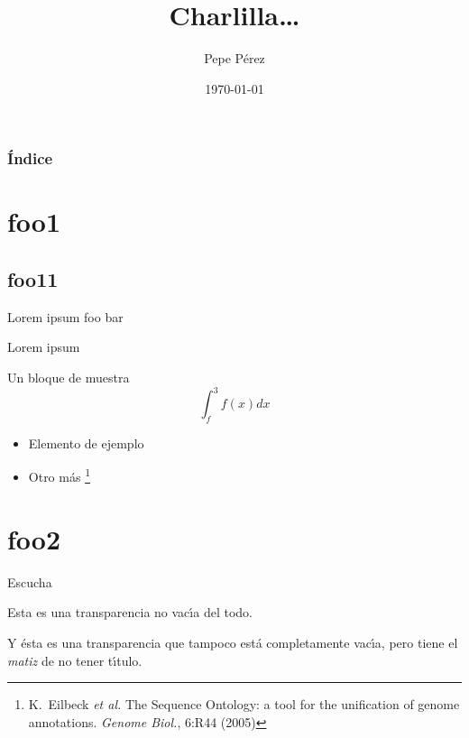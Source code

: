 \documentclass[a4paper]{beamer}
\author{Pepe P\'erez}
\title{Charlilla\ldots}
\date{\today}
\begin{document}
\begin{frame}

\titlepage
\end{frame}

\begin{frame}
	\frametitle{\'Indice}
	\tableofcontents
\end{frame}

\section{foo1}
\subsection{foo11}

\begin{frame}{Lorem ipsum}
foo bar
\end{frame}

\begin{frame}{Lorem ipsum}
\begin{block}{Un bloque de muestra}
$$\int_{f}^3 f(x) dx$$
\begin{itemize}
  \item Elemento de ejemplo
  \pause
  \item Otro m\'as
  \footnote{\tiny K.~Eilbeck \emph{et al.} The Sequence Ontology: a tool for 
  the unification of genome annotations. \emph{Genome Biol.}, 6:R44 (2005)}
\end{itemize}
\end{block}
\end{frame}

\section{foo2}
\begin{frame}[plain]{Escucha}
\vfill
\begin{center}\begin{Large}Esta es una transparencia no
vac\'{\i}a del todo.\end{Large}\vfill
\end{center}
\vfill
\end{frame}

\begin{frame}
  \vfill
  \begin{center}\begin{Large}Y \'esta es una transparencia que tampoco est\'a
completamente vac\'{\i}a, pero tiene el \emph{matiz} de no 
tener t\'{\i}tulo.\end{Large}\vfill
  \end{center}
  \vfill
\end{frame}
\end{document}
